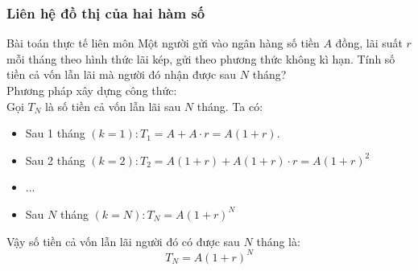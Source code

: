 \begin{tomtat}
	\subsubsection{Liên hệ đồ thị của hai hàm số}
\end{tomtat}
\begin{dang}{Bài toán thực tế liên môn}
	Một người gửi vào ngân hàng số tiền $A$ đồng, lãi suất $r$ mỗi tháng theo hình thức lãi kép, gửi theo phương thức không kì hạn. Tính số tiền cả vốn lẫn lãi mà người đó nhận được sau $N$ tháng?\\
	Phương pháp xây dựng công thức:\\
	Gọi $T_N$ là số tiền cả vốn lẫn lãi sau $N$ tháng. Ta có:\\
	\begin{itemize}
		\item Sau 1 tháng $(k=1): T_1=A+A \cdot r=A(1+r)$.
		\item Sau 2 tháng $(k=2): T_2=A(1+r)+A(1+r) \cdot r=A(1+r)^2$
		\item ...
		\item Sau $N$ tháng $(k=N): T_N=A(1+r)^N$
	\end{itemize}
	Vậy số tiền cả vốn lẫn lãi người đó có được sau $N$ tháng là:
	$$T_N=A(1+r)^N$$
\end{dang}
